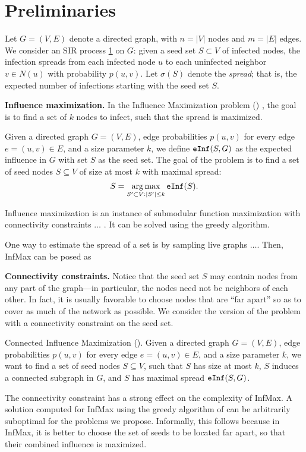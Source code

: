 \section{Preliminaries}
Let $G = (V,E)$ denote a directed graph, with $n = |V|$ nodes and $m = |E|$ edges. We consider an SIR process \ref{} on $G$: given a seed set $S \subset V$ of infected nodes, the infection spreads from each infected node $u$ to each uninfected neighbor $v\in N(u)$ with probability $p(u,v)$. Let $\sigma(S)$ denote the \emph{spread}; that is, the expected number of infections starting with the seed set $S$.

\noindent
\textbf{Influence maximization.}
In the Influence Maximization problem (\infmax) \cite{kempe:sigkdd03}, the goal is to find a set of $k$ nodes to infect, such that the spread is maximized.

Given a directed graph $G = (V,E)$, edge probabilities $p(u,v)$ for every edge $e=(u,v) \in E$, and a size parameter $k$, we define $\texttt{eInf}(S, G)$ as the expected influence in $G$ with set $S$ as the seed set. The goal of the \infmax{} problem is to find a set of seed nodes $S \subseteq V$ of size at most $k$ with maximal spread:
$$
S = \operatorname*{arg\,max}_{S' \subset V: |S'| \leq k} \texttt{eInf}(S).
$$


Influence maximization is an instance of submodular function maximization with connectivity constraints $\ldots$ . It can be solved using the greedy algorithm.

One way to estimate the spread of a set is by sampling live graphs $\ldots$. Then, InfMax can be posed as 

\noindent
\textbf{Connectivity constraints.}
Notice that the seed set $S$ may contain nodes from any part of the graph---in particular, the nodes need not be neighbors of each other. In fact, it is usually favorable to choose nodes that are ``far apart'' so as to cover as much of the network as possible. We consider the version of the problem with a connectivity constraint on the seed set.

\begin{problem}{Connected Influence Maximization (\prob{}).}
Given a directed graph $G = (V,E)$, edge probabilities $p(u,v)$ for every edge $e=(u,v) \in E$, and a size parameter $k$, we want to find a set of seed nodes $S \subseteq V$, such that $S$ has size at most $k$, $S$ induces a connected subgraph in $G$, and $S$ has maximal spread $\texttt{eInf}(S, G)$.
\end{problem}

The connectivity constraint has a strong effect on the complexity of InfMax. A solution computed for InfMax using the greedy algorithm of \cite{kempe:sigkdd03} can be arbitrarily suboptimal for the problems we propose. Informally, this follows because in InfMax, it is better to choose the set of seeds to be located far apart, so that their combined influence is maximized.
